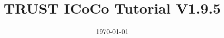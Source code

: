 \documentclass[10pt, hyperref={unicode=true,pdfusetitle, bookmarks=true,bookmarksnumbered=false,bookmarksopen=false, breaklinks=false,pdfborder={0 0 1},backref=true,colorlinks=true,linkcolor=darkblue,pageanchor, urlcolor=darkblue}]{beamer}
\title[TRUST ICoCo Tutorial V1.9.5]{TRUST ICoCo Tutorial V1.9.5}
\institute[CEA/DES/ISAS/DM2S] %
{
CEA Saclay \\ %
\medskip
\textit{Support team: trust@cea.fr} %
\medskip
}
\date{\today} %
\begin{document}
\begin{frame}
\titlepage %
\end{frame}

\begin{frame}
\tableofcontents [hideallsubsections]
\end{frame}
\end{document}

